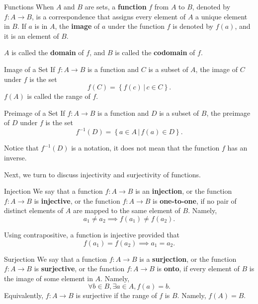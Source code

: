 \begin{definition}{Functions}
When $A$ and $B$ are sets, a {\bf function} $f$ from $A$ to $B$, denoted by $f:A\rightarrow B$, is a correspondence that assigns every element of $A$ a unique element in $B$. If $a$ is in $A$, the {\bf image} of $a$ under the function $f$ is denoted by $f(a)$, and it is an element of $B$.

$A$ is called the {\bf domain} of $f$, and $B$ is called the {\bf codomain} of $f$.
\end{definition}
\begin{definition}
{Image of a Set}
If $f:A\to B$ is a function and $C$ is a subset of $A$, the image of $C$ under $f$ is the set 
\[f(C)=\left\{f(c)\,|\,c\in C\right\}.\]
$f(A)$ is called the range of $f$.

\end{definition} 


\begin{definition}
{Preimage of a Set}
If $f:A\to B$ is a function and $D$ is a subset of $B$, the preimage of $D$ under $f$ is the set 
\[f^{-1}(D)=\left\{a\in A\,|\,f(a)\in D\right\}.\]
 
\end{definition} 
Notice that $f^{-1}(D)$ is a notation, it does not mean that the function $f$ has an inverse.

Next, we turn to discuss injectivity and surjectivity of functions.
\begin{definition}{Injection}
We say that a function $f:A\to B$ is an {\bf injection}, or the function $f:A\rightarrow B$ is {\bf injective}, or the function $f:A\to B$ is {\bf one-to-one}, if no pair of distinct elements of $A$ are mapped to the same element of $B$.
Namely,
\[a_1\neq a_2 \implies f(a_1)\neq f(a_2).\]

\end{definition}

Using contrapositive, a function is injective provided that
\[f(a_1)=f(a_2)\implies a_1=a_2.\]


\begin{definition}{Surjection}
We say that a function $f:A\to B$ is a {\bf surjection}, or the function $f:A\rightarrow B$ is {\bf surjective}, or the function $f:A\to B$ is {\bf onto}, if every element of $B$ is the image of some element in $A$.
Namely,
\[\forall b\in B, \exists a\in A, f(a)=b.\]
Equivalently, $f:A\to B$ is surjective if the range of $f$ is $B$. Namely, $f(A)=B$.

\end{definition}

